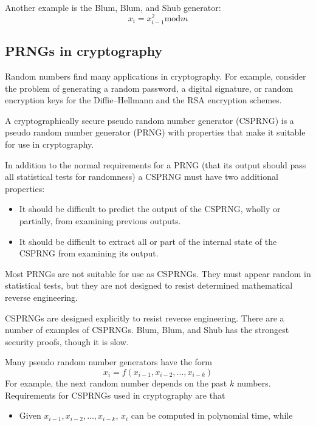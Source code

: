 \documentclass[justified, sixbynine]{tufte-book}
\theoremstyle{plain}%
\newtheorem * {corollary}{Corollary}
\theoremstyle{definition}
\theoremstyle{remark}
\newtheorem * {remark}{Remark}
\newtheorem * {note}{Note}
\begin{document}
\begin{fullwidth}
Another example is the Blum, Blum, and Shub generator:
\begin{equation}
x_i=x_{i-1}^2\textrm{mod}m
\end{equation}

\goodbreak\subsection{PRNGs in cryptography}

Random numbers find many applications in cryptography. For example, consider
the problem of generating a random password, a digital signature, or random
encryption keys for the Diffie--Hellmann and the RSA encryption schemes.

A cryptographically secure pseudo random number generator (CSPRNG) is a
pseudo random number generator (PRNG) with properties that make it suitable
for use in cryptography.

In addition to the normal requirements for a PRNG (that its output
should pass all statistical tests for randomness) a CSPRNG must have two
additional properties:

\begin{itemize}
\item  It should be difficult to predict the output of the CSPRNG, wholly or
partially, from examining previous outputs.

\item  It should be difficult to extract all or part of the internal state
of the CSPRNG from examining its output.
\end{itemize}

Most PRNGs are not suitable for use as CSPRNGs. They must appear random
in statistical tests, but they are not designed to resist determined
mathematical reverse engineering.

CSPRNGs are designed explicitly to resist reverse engineering. There are a
number of examples of CSPRNGs. Blum, Blum, and Shub has the strongest security
proofs, though it is slow.

Many pseudo random number generators have the form
\begin{equation}
x_i=f(x_{i-1}, x_{i-2}, ..., x_{i-k})
\end{equation}
For example, the next random number depends on the past $k$ numbers. Requirements for CSPRNGs used in cryptography are that

\begin{itemize}
\item  Given $x_{i-1}, x_{i-2}, ..., x_{i-k}$, $x_i$ can be computed in
polynomial time, while


\end{itemize}
\end{fullwidth}
\end{document}
